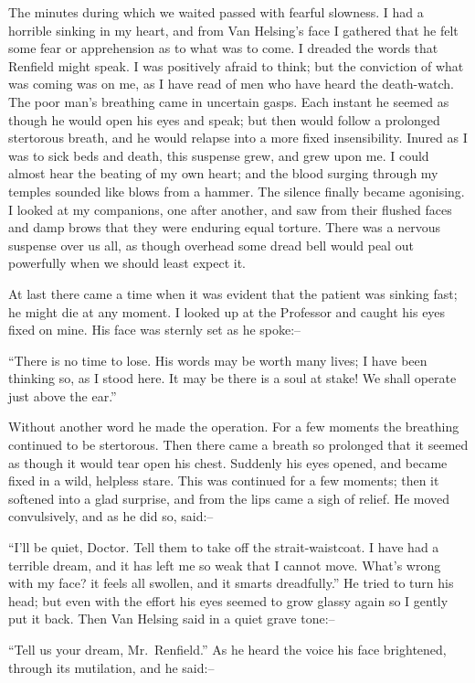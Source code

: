 \documentclass[12pt,openright]{book}
\begin{document}
The minutes during which we waited passed with fearful slowness. I had a horrible sinking in my heart, and from Van Helsing’s face I gathered that he felt some fear or apprehension as to what was to come. I dreaded the words that Renfield might speak. I was positively afraid to think; but the conviction of what was coming was on me, as I have read of men who have heard the death-watch. The poor man’s breathing came in uncertain gasps. Each instant he seemed as though he would open his eyes and speak; but then would follow a prolonged stertorous breath, and he would relapse into a more fixed insensibility. Inured as I was to sick beds and death, this suspense grew, and grew upon me. I could almost hear the beating of my own heart; and the blood surging through my temples sounded like blows from a hammer. The silence finally became agonising. I looked at my companions, one after another, and saw from their flushed faces and damp brows that they were enduring equal torture. There was a nervous suspense over us all, as though overhead some dread bell would peal out powerfully when we should least expect it.

At last there came a time when it was evident that the patient was sinking fast; he might die at any moment. I looked up at the Professor and caught his eyes fixed on mine. His face was sternly set as he spoke:–

“There is no time to lose. His words may be worth many lives; I have been thinking so, as I stood here. It may be there is a soul at stake! We shall operate just above the ear.”

Without another word he made the operation. For a few moments the breathing continued to be stertorous. Then there came a breath so prolonged that it seemed as though it would tear open his chest. Suddenly his eyes opened, and became fixed in a wild, helpless stare. This was continued for a few moments; then it softened into a glad surprise, and from the lips came a sigh of relief. He moved convulsively, and as he did so, said:–

“I’ll be quiet, Doctor. Tell them to take off the strait-waistcoat. I have had a terrible dream, and it has left me so weak that I cannot move. What’s wrong with my face? it feels all swollen, and it smarts dreadfully.” He tried to turn his head; but even with the effort his eyes seemed to grow glassy again so I gently put it back. Then Van Helsing said in a quiet grave tone:–

“Tell us your dream, Mr. Renfield.” As he heard the voice his face brightened, through its mutilation, and he said:–
\end{document}
